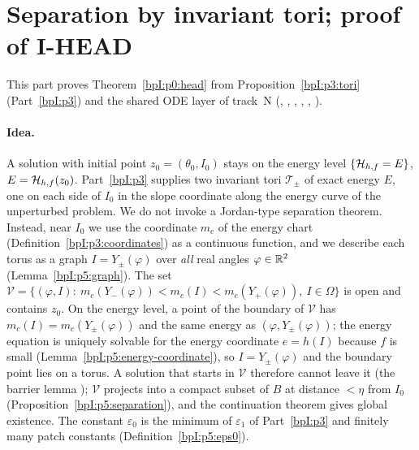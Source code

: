 \section{Separation by invariant tori; proof of I-HEAD}\label{bpI:p5}

This part proves Theorem~\ref{bpI:p0:head} from Proposition~\ref{bpI:p3:tori} (Part~\ref{bpI:p3}) and the shared ODE layer of
track~N (, , ,
, , ).

\paragraph{Idea.} A solution with initial point $z_0=(\theta_0,I_0)$ stays on the energy level $\{\mathcal H_{h,f}=E\}$, $E=\mathcal H_{h,f}(z_0)$. Part~\ref{bpI:p3}
supplies two invariant tori $\mathcal T_\pm$ of exact energy $E$, one on each side of $I_0$ in the slope coordinate along the energy curve of the
unperturbed problem. We do not invoke a Jordan-type separation theorem. Instead, near $I_0$ we use the coordinate $m_c$ of the
energy chart (Definition~\ref{bpI:p3:coordinates}) as a continuous function, and we describe each torus as a graph $I=Y_\pm(\varphi)$ over
\emph{all} real angles $\varphi\in\mathbb{R}^2$ (Lemma~\ref{bpI:p5:graph}). The set
$\mathcal V=\{(\varphi,I):\ m_c(Y_-(\varphi))<m_c(I)<m_c(Y_+(\varphi)),\ I\in\Omega\}$ is open and contains $z_0$.
On the energy level, a point of the boundary of $\mathcal V$ has $m_c(I)=m_c(Y_\pm(\varphi))$ and the same energy as
$(\varphi,Y_\pm(\varphi))$; the energy equation is uniquely solvable for the energy coordinate $e=h(I)$ because $f$ is small
(Lemma~\ref{bpI:p5:energy-coordinate}), so $I=Y_\pm(\varphi)$ and the boundary point lies on a torus. A solution that starts in
$\mathcal V$ therefore cannot leave it (the barrier lemma ); $\mathcal V$ projects into a compact subset of $B$ at distance $<\eta$ from $I_0$
(Proposition~\ref{bpI:p5:separation}), and the continuation theorem gives global existence. The constant $\varepsilon_0$ is the
minimum of $\varepsilon_1$ of Part~\ref{bpI:p3} and finitely many patch constants (Definition~\ref{bpI:p5:eps0}).


